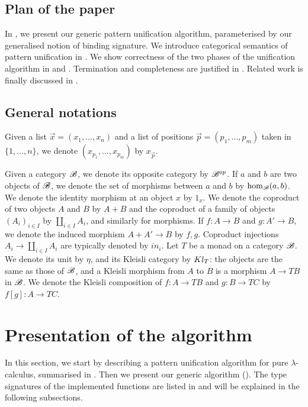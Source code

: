 \subsection*{Plan of the paper}

In , we present our generic pattern unification
algorithm, parameterised by our generalised notion of binding signature.
We introduce categorical semantics of pattern unification in .
We show correctness of the two phases of the unification algorithm
in  and . Termination
and completeness are justified in .
Related work is finally discussed in .

\subsection*{General notations}

Given a list $\vec{x}=(x_{1},\dots,x_{n})$ and a list of positions
$\vec{p}=(p_{1},\dots,p_{m})$ taken in $\{1,\dots,n\}$, we denote
$(x_{p_{1}},\dots,x_{p_{m}})$ by $x_{\vec{p}}$. 

Given a category $\mathscr{B}$, we denote its opposite category by $\mathscr{B}^{op}$.
If $a$ and $b$ are two objects of $\mathscr{B}$, we denote the set of morphisms
between $a$ and $b$ by $\hom_{\mathscr{B}}(a,b)$. We denote the identity
morphism at an object $x$ by $1_{x}$. We denote the coproduct of
two objects $A$ and $B$ by $A+B$ and the coproduct of a family
of objects $(A_{i})_{i\in I}$ by $\coprod_{i\in I}A_{i}$, and similarly
for morphisms. If $f:A\rightarrow B$ and $g:A'\rightarrow B$, we
 denote the induced morphism $A+A'\rightarrow B$ by $f,g$. Coproduct
injections $A_{i}\rightarrow\coprod_{i\in I}A_{i}$ are typically
denoted by $in_{i}$. Let $T$ be a monad on a category $\mathscr{B}$. We
denote its unit by $\eta$, and its Kleisli category by $Kl_{T}$:
the objects are the same as those of $\mathscr{B}$, and a Kleisli morphism
from $A$ to $B$ is a morphism $A\rightarrow TB$ in $\mathscr{B}$. We denote
the Kleisli composition of $f:A\rightarrow TB$ and $g:B\rightarrow TC$
by $f[g]:A\rightarrow TC$. 

\section{Presentation of the algorithm}

\label{sec:summary-algo}

In this section, we start by describing a pattern unification algorithm
for pure $\lambda$-calculus, summarised in .
Then we present our generic algorithm (). The
type signatures of the implemented functions are listed in 
and will be explained in the following subsections.

